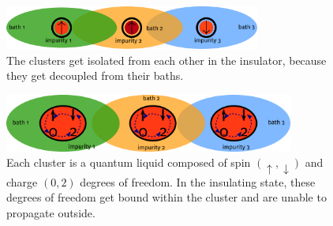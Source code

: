\documentclass[10pt]{report}
\numberwithin{equation}{section}
\begin{document}
\begin{figure}[!ht]
	\centering
	\includegraphics[width=0.75\textwidth]{../figures/ins_prop.pdf}
	\caption{The clusters get isolated from each other in the insulator, because they get decoupled from their baths.}
\end{figure}

\begin{figure}[!ht]
	\centering
	\includegraphics[width=0.85\textwidth]{../figures/ins_prop_cluster.pdf}
	\caption{Each cluster is a quantum liquid composed of spin \(\left(\uparrow,\downarrow\right) \) and charge \(\left(0,2\right) \) degrees of freedom. In the insulating state, these degrees of freedom get bound within the cluster and are unable to propagate outside.}
\end{figure}
\end{document}
